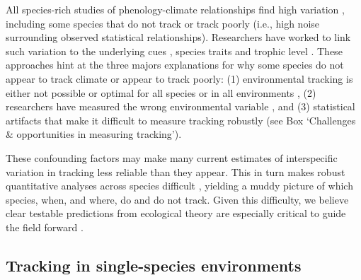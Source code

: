 \documentclass[11pt,letterpaper]{article}
\begin{document}
All species-rich studies of phenology-climate relationships find high variation \citep{Cook:2012pnas,thackeray2016}, including some species that do not track or track poorly (i.e., high noise surrounding observed statistical relationships). Researchers have worked to link such variation to the underlying cues \citep[e.g.,][]{Cook:2012pnas}, species traits \citep[e.g.,][]{cohen2018} and trophic level \citep[e.g.,][]{thackeray2016}. These approaches hint at the three majors explanations for why some species do not appear to track climate or appear to track poorly: (1) environmental tracking is either not possible or optimal for all species or in all environments \citep[][]{simons2011}, (2) researchers have measured the wrong environmental variable \citep[i.e., a variable species do not track,][]{chmura2019}, and (3) statistical artifacts that make it difficult to measure tracking robustly (see Box `Challenges \& opportunities in measuring tracking'). 

These confounding factors may make many current estimates of interspecific variation in tracking less reliable than they appear. This in turn makes robust quantitative analyses across species difficult \citep{brown2016,kharouba2018}, yielding a muddy picture of which species, when, and where, do and do not track. Given this difficulty, we believe clear testable predictions from ecological theory are especially critical to guide the field forward \citep{Smaldino2016}.  

\subsection{Tracking in single-species environments}
\end{document}
